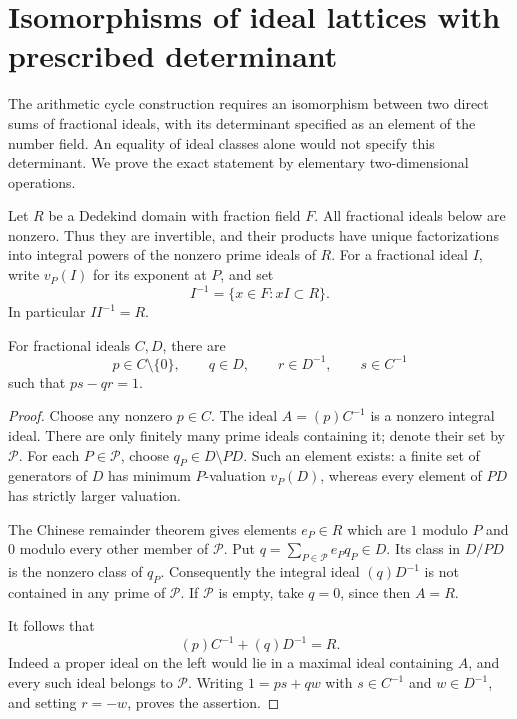 \section{Isomorphisms of ideal lattices with prescribed determinant}
\label{si-section}

The arithmetic cycle construction requires an isomorphism
between two direct sums of fractional ideals, with its
determinant specified as an element of the number field.
An equality of ideal classes alone would not specify this
determinant.  We prove the exact statement by elementary
two-dimensional operations.

Let \(R\) be a Dedekind domain with fraction field \(F\).
All fractional ideals below are nonzero.  Thus they are
invertible, and their products have unique factorizations
into integral powers of the nonzero prime ideals of \(R\).
For a fractional ideal \(I\), write \(v_P(I)\) for its
exponent at \(P\), and set
\[
 I^{-1}=\{x\in F:xI\subset R\}.
\]
In particular \(II^{-1}=R\).

\begin{lemma}\label{si-two-elements}
For fractional ideals \(C,D\), there are
\[
 p\in C\setminus\{0\},\qquad q\in D,\qquad
 r\in D^{-1},\qquad s\in C^{-1}
\]
such that \(ps-qr=1\).
\end{lemma}
\begin{proof}
Choose any nonzero \(p\in C\).
The ideal \(A=(p)C^{-1}\) is a nonzero integral ideal.
There are only finitely many prime ideals containing it;
denote their set by \(\mathcal P\).
For each \(P\in\mathcal P\), choose
\(q_P\in D\setminus PD\).
Such an element exists: a finite set of generators of
\(D\) has minimum \(P\)-valuation \(v_P(D)\), whereas
every element of \(PD\) has strictly larger valuation.

The Chinese remainder theorem gives elements
\(e_P\in R\) which are \(1\) modulo \(P\) and
\(0\) modulo every other member of \(\mathcal P\).
Put \(q=\sum_{P\in\mathcal P}e_Pq_P\in D\).
Its class in \(D/PD\) is the nonzero class of \(q_P\).
Consequently the integral ideal \((q)D^{-1}\) is not
contained in any prime of \(\mathcal P\).
If \(\mathcal P\) is empty, take \(q=0\), since
then \(A=R\).

It follows that
\[
                 (p)C^{-1}+(q)D^{-1}=R.
\]
Indeed a proper ideal on the left would lie in a maximal
ideal containing \(A\), and every such ideal belongs
to \(\mathcal P\).
Writing \(1=ps+qw\) with
\(s\in C^{-1}\) and \(w\in D^{-1}\), and setting
\(r=-w\), proves the assertion.
\end{proof}

